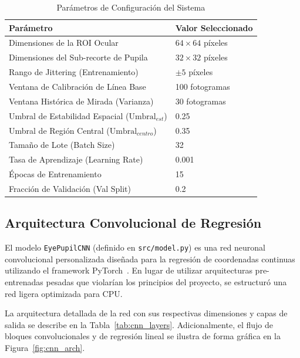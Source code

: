 \documentclass[twocolumn,10pt,letterpaper]{article}
\begin{document}
\begin{table}[ht]
\centering
\caption{Parámetros de Configuración del Sistema}
\label{tab:config}
\small
\begin{tabular}{p{4.8cm}p{2.8cm}}
\toprule
\textbf{Parámetro} & \textbf{Valor Seleccionado} \\
\midrule
Dimensiones de la ROI Ocular & $64 \times 64$ píxeles \\
Dimensiones del Sub-recorte de Pupila & $32 \times 32$ píxeles \\
Rango de Jittering (Entrenamiento) & $\pm 5$ píxeles \\
Ventana de Calibración de Línea Base & 100 fotogramas \\
Ventana Histórica de Mirada (Varianza) & 30 fotogramas \\
Umbral de Estabilidad Espacial ($\text{Umbral}_{est}$) & 0.25 \\
Umbral de Región Central ($\text{Umbral}_{centro}$) & 0.35 \\
Tamaño de Lote (Batch Size) & 32 \\
Tasa de Aprendizaje (Learning Rate) & 0.001 \\
Épocas de Entrenamiento & 15 \\
Fracción de Validación (Val Split) & 0.2 \\
\bottomrule
\end{tabular}
\end{table}

\subsection{Arquitectura Convolucional de Regresión}
El modelo \texttt{EyePupilCNN} (definido en \texttt{src/model.py}) es una red neuronal convolucional personalizada diseñada para la regresión de coordenadas continuas utilizando el framework PyTorch~\cite{pytorch}. En lugar de utilizar arquitecturas pre-entrenadas pesadas que violarían los principios del proyecto, se estructuró una red ligera optimizada para CPU. 

La arquitectura detallada de la red con sus respectivas dimensiones y capas de salida se describe en la Tabla~\ref{tab:cnn_layers}. Adicionalmente, el flujo de bloques convolucionales y de regresión lineal se ilustra de forma gráfica en la Figura~\ref{fig:cnn_arch}.
\end{document}
